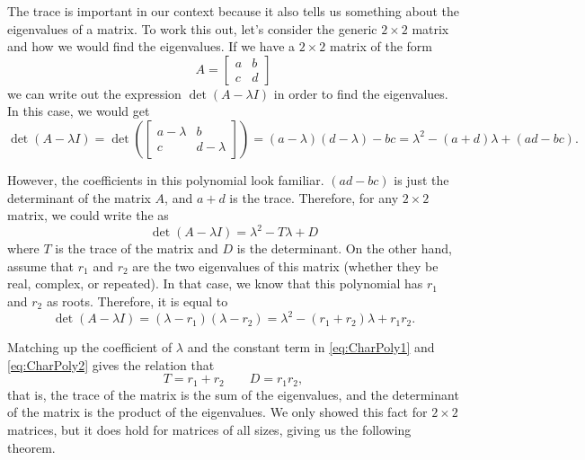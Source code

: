 The trace is important in our context because it also tells us something about the eigenvalues of a matrix. To work this out, let's consider the generic $2\times 2$ matrix and how we would find the eigenvalues. If we have a $2 \times 2$ matrix of the form
\begin{equation*}
A = \begin{bmatrix} a & b \\ c & d
\end{bmatrix}
\end{equation*}
we can write out the expression $\det(A - \lambda I)$ in order to find the eigenvalues. In this case, we would get
\begin{equation*}
\det(A - \lambda I) = \det\left( \begin{bmatrix} a - \lambda & b \\ c & d - \lambda \end{bmatrix} \right) = (a-\lambda)(d-\lambda) - bc = \lambda^2 - (a+d)\lambda + (ad - bc).
\end{equation*}

However, the coefficients in this polynomial look familiar. $(ad-bc)$ is just the determinant of the matrix $A$, and $a+d$ is the trace. Therefore, for any $2 \times 2$ matrix, we could write the  as 
\begin{equation}
\det(A - \lambda I) = \lambda^2 - T\lambda + D
\label{eq:CharPoly1}
\end{equation}
where $T$ is the trace of the matrix and $D$ is the determinant. On the other hand, assume that $r_1$ and $r_2$ are the two eigenvalues of this matrix (whether they be real, complex, or repeated). In that case, we know that this polynomial has $r_1$ and $r_2$ as roots. Therefore, it is equal to
\begin{equation}
\det(A - \lambda I) = (\lambda - r_1)(\lambda - r_2) = \lambda^2 - (r_1 + r_2)\lambda + r_1r_2.
\label{eq:CharPoly2}
\end{equation}

Matching up the coefficient of $\lambda$ and the constant term in \eqref{eq:CharPoly1} and \eqref{eq:CharPoly2} gives the relation that
\begin{equation*}
T = r_1 + r_2 \qquad D = r_1r_2,
\end{equation*}
that is, the trace of the matrix is the sum of the eigenvalues, and the determinant of the matrix is the product of the eigenvalues. We only showed this fact for $2 \times 2$ matrices, but it does hold for matrices of all sizes, giving us the following theorem.

